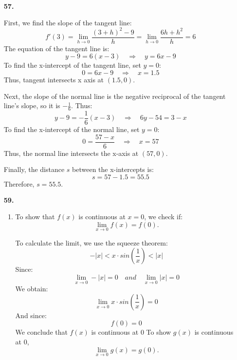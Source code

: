 \documentclass[12pt]{article}
\begin{document}


\begin{enumerate}[start=1,label={\bfseries. },leftmargin=1in] %
    \item [\textbf{57.}]

    First, we find the slope of the tangent line:
    \[
    f'(3) = \lim_{h \to 0} \frac{(3 + h)^2 - 9}{h} = \lim_{h \to 0} \frac{6h + h^2}{h} = 6
    \]
    The equation of the tangent line is:
    \[
    y - 9 = 6(x - 3) \quad \Rightarrow \quad y = 6x - 9
    \]
    To find the x-intercept of the tangent line, set \( y = 0 \):
    \[
    0 = 6x - 9 \quad \Rightarrow \quad x = 1.5
    \]
    Thus, tangent intersects x axis at \( (1.5, 0) \).

    Next, the slope of the normal line is the negative reciprocal of the tangent line's slope, so it is \( -\frac{1}{6} \). Thus:
    \[
    y - 9 = -\frac{1}{6}(x - 3) \quad \Rightarrow \quad 6y-54 = 3-x
    \]
    To find the x-intercept of the normal line, set \( y = 0 \):
    \[
    0 = \frac{57-x}{6} \quad \Rightarrow \quad x = 57
    \]
    Thus, the normal line intersects the x-axis at \( (57, 0) \).

    Finally, the distance \( s \) between the x-intercepts is:
    \[
    s = 57 - 1.5 = 55.5
    \]
    Therefore, \( s = {55.5} \).

    \item [\textbf{59.}]
    
    \begin{enumerate}
        \item 
        To show that \( f(x) \) is continuous at \( x = 0 \), we check if:
        \[
        \lim_{x \to 0} f(x) = f(0).
        \]
        
        To calculate the limit, we use the squeeze theorem:
        \[
        -|x| < x\cdot sin\left(\frac{1}{x}\right) < |x|
        \]
        Since:
        \[
        \lim_{x\to0} -|x| = 0 \quad and \quad \lim_{x\to0}|x| = 0
        \]
        We obtain:
        \[
        \lim_{x\to0}x\cdot sin\left(\frac{1}{x}\right) = 0
        \]
        And since:
        \[
        f(0) = 0
        \]
        We conclude that $f(x)$ is continuous at 0
        \bigbreak
        To show $g(x)$ is continuous at 0,
        \[
        \lim_{x \to 0} g(x) = g(0).
        \]
        

\end{enumerate}
\end{enumerate}
\end{document}
